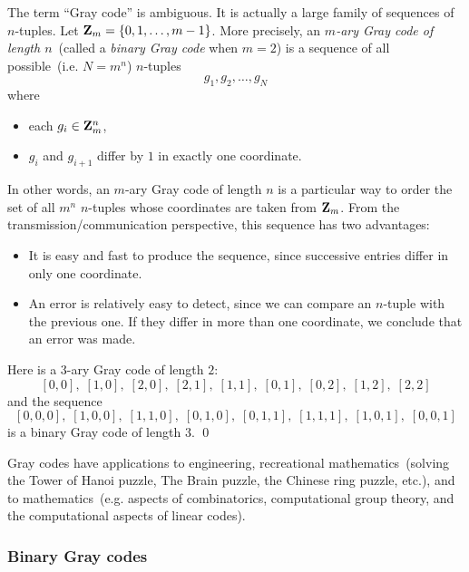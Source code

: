 The term ``Gray code'' is ambiguous. It is actually a
large family of sequences of $n$-tuples. Let
$\mathbf{Z}_m = \{0, 1, \dots, m-1\}$. More precisely, an
\emph{$m$-ary Gray code of length $n$}~(called
a \emph{binary Gray code} when $m = 2$) is a
sequence of all possible~(i.e. $N = m^n$) $n$-tuples
\[
g_1, g_2, \dots, g_N
\]
where
\begin{itemize}
\item each $g_i \in \mathbf{Z}_m^n$,

\item $g_i$ and $g_{i+1}$ differ by $1$ in exactly one coordinate.
\end{itemize}
In other words, an $m$-ary Gray code of length $n$ is a particular way
to order the set of all $m^n$ $n$-tuples whose coordinates are taken
from $\mathbf{Z}_m$. From the transmission/communication perspective, this
sequence has two advantages:
\begin{itemize}
\item It is easy and fast to produce the sequence, since successive
  entries differ in only one coordinate.

\item An error is relatively easy to detect, since we can compare an
  $n$-tuple with the previous one. If they differ in more than one
  coordinate, we conclude that an error was made.
\end{itemize}

\begin{example}
\rm
Here is a $3$-ary Gray code of length $2$:
\[
[0,0],\; [1,0],\; [2,0],\; [2,1],\; [1,1],\; [0,1],\; [0,2],\;
[1,2],\; [2,2]
\]
and the sequence
\[
[0,0,0],\; [1,0,0],\; [1,1,0],\; [0,1,0],\; [0,1,1],\;
[1,1,1],\; [1,0,1],\; [0,0,1]
\]
is a binary Gray code of length $3$. \qed
\end{example}

Gray codes have applications to engineering, recreational
mathematics~(solving the Tower of
Hanoi puzzle, The
Brain puzzle, the Chinese
ring  puzzle, etc.), and to
mathematics~(e.g. aspects of combinatorics,
computational group theory, and the
computational aspects of linear codes).



\subsubsection{Binary Gray codes}

